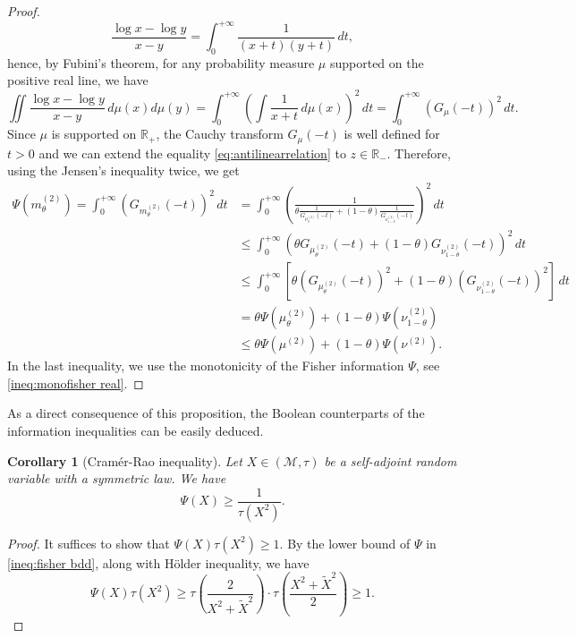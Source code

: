 \documentclass[10pt, reqno]{amsart}
\numberwithin{equation}{section}
\theoremstyle{definition}
\theoremstyle{plain}
\newtheorem{corollary}[definition]{Corollary}
\theoremstyle{remark}
\newcommand{\R}{\mathbb{R}}
\newcommand{\1}{\mathbbm{1}}
\begin{document}
\begin{proof}
\begin{equation*}
            \frac{\log x - \log y}{x-y} = \int_{0}^{+\infty} \frac{1}{(x+t)(y+t)}\,dt,
        \end{equation*}
        hence, by Fubini's theorem, for any probability measure $\mu$ supported on the positive real line, we have
        \begin{equation*}
            \iint \frac{\log x - \log y}{x-y} \,d\mu(x)d\mu(y) = \int_{0}^{+\infty} \left( \int \frac{1}{x+t}\,d\mu(x) \right)^2\,dt = \int _0^{+\infty} \left(G_{\mu}(-t)\right)^2\,dt.
        \end{equation*}
        Since $\mu$ is supported on $\R_+$, the Cauchy transform $G_{\mu}(-t)$ is well defined for $t>0$ and we can extend the equality \eqref{eq:antilinearrelation} to $z\in \R_-$. Therefore, using the Jensen's inequality twice, we get
        \begin{align*}
            \Psi(m^{(2)}_{\theta}) = \int_0^{+\infty} (G_{m^{(2)}_{\theta}}(-t))^2\,dt &= \int_0^{+\infty}\left( \frac{1}{\theta\frac{1}{G_{\mu^{(2)}_{\theta}}(-t)}+(1-\theta)\frac{1}{G_{\nu^{(2)}_{1-\theta}}(-t)}} \right)^2\,dt\\
            &\leq  \int_0^{+\infty} \left( \theta G_{\mu^{(2)}_\theta}(-t) + (1-\theta) G_{\nu^{(2)}_{1-\theta}}(-t) \right)^2\,dt\\
            &\leq  \int_0^{+\infty} \left[ \theta (G_{\mu^{(2)}_\theta}(-t))^2 + (1-\theta) (G_{\nu^{(2)}_{1-\theta}}(-t))^2\right]\,dt\\
            &= \theta\Psi(\mu^{(2)}_{\theta}) + (1-\theta)\Psi(\nu^{(2)}_{1-\theta})\\
            &\le \theta \Psi(\mu^{(2)}) + (1-\theta)\Psi(\nu^{(2)}).
        \end{align*}
        In the last inequality, we use the monotonicity of the Fisher information $\Psi$, see \eqref{ineq:monofisher real}.
	\end{proof}
    As a direct consequence of this proposition, the Boolean counterparts of the information inequalities can be easily deduced.
	\begin{corollary}[Cramér-Rao inequality]
    Let $X\in(\mathcal{M},\tau)$ be a self-adjoint random variable with a symmetric law. We have
	\begin{equation}
		\Psi(X)\ge \frac{1}{\tau(X^2)}.
	\end{equation}
	\end{corollary}
	\begin{proof}
		It suffices to show that $\Psi(X)\tau(X^2)\ge 1$. By the lower bound of $\Psi$ in \eqref{ineq:fisher bdd}, along with H\"{o}lder inequality, we have
		\begin{equation*}
			\Psi(X)\tau(X^2)\ge \tau\left(\frac{2}{X^2+\tilde{X}^2}\right)\cdot \tau\left( \frac{X^2+\tilde{X}^2}{2} \right)\ge 1.
		\end{equation*}
	\end{proof}
\end{document}
